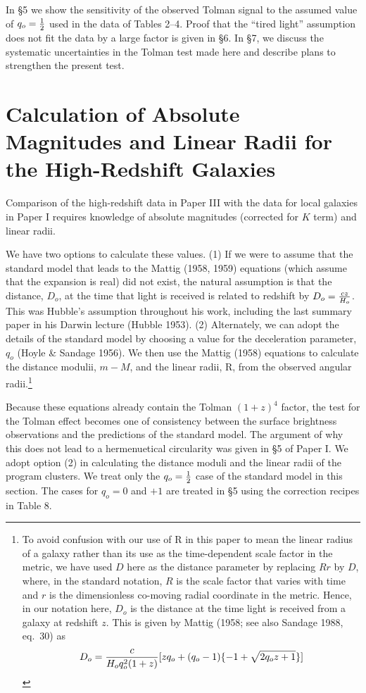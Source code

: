 \documentclass[preprint]{aastex}
\begin{document}
In \S 5 we show the sensitivity of the observed Tolman signal to the
assumed value of $q_o = {1\over{2}}$ used in the data of Tables 2--4.
Proof that the ``tired light'' assumption does not fit the data by a
large factor is given in \S 6. In \S 7, we discuss the systematic
uncertainties in the Tolman test made here and describe plans to
strengthen the present test.

\section{Calculation of Absolute Magnitudes and Linear Radii for the 
High-Redshift Galaxies}

Comparison of the high-redshift data in Paper III with the data for
local galaxies in Paper I requires knowledge of absolute magnitudes
(corrected for $K$ term) and linear radii.

We have two options to calculate these values. (1) If we were to
assume that the standard model that leads to the Mattig (1958, 1959)
equations (which assume that the expansion is real) did not exist, the
natural assumption is that the distance, $D_o$, at the time that light
is received is related to redshift by $D_o = {{cz}\over{H_o}}$.  This
was Hubble's assumption throughout his work, including the last
summary paper in his Darwin lecture (Hubble 1953). (2) Alternately, we
can adopt the details of the standard model by choosing a value for
the deceleration parameter, $q_o$ (Hoyle \& Sandage 1956). We then use
the Mattig (1958) equations to calculate the distance modulii, $m -
M$, and the linear radii, R, from the observed angular
radii.\footnote{To avoid confusion with our use of R in this paper to
mean the linear radius of a galaxy rather than its use as the
time-dependent scale factor in the metric, we have used $D$ here as
the distance parameter by replacing $Rr$ by $D$, where, in the
standard notation, $R$ is the scale factor that varies with time and
$r$ is the dimensionless co-moving radial coordinate in the
metric. Hence, in our notation here, $D_o$ is the distance at the time
light is received from a galaxy at redshift $z$. This is given by
Mattig (1958; see also Sandage 1988, eq.\ 30) as
\begin{equation}
D_o = {c\over{H_o q_o^2 (1+z)}} [z q_o + (q_o - 1) \{-1 +
\sqrt{2 q_o z + 1}\}]
\end{equation}} 

Because these equations already contain the Tolman $(1 + z)^4$ factor,
the test for the Tolman effect becomes one of consistency between the
surface brightness observations and the predictions of the standard
model. The argument of why this does not lead to a hermenuetical
circularity was given in \S 5 of Paper I.  We adopt option (2) in
calculating the distance moduli and the linear radii of the program
clusters. We treat only the $q_o = {1\over{2}}$ case of the standard
model in this section. The cases for $q_o = 0$ and $+1$ are treated in
\S 5 using the correction recipes in Table 8.
\end{document}
